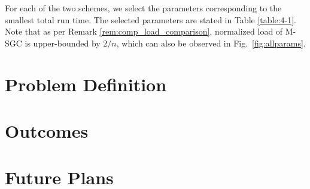 	For each of the two schemes, we select the parameters corresponding to the smallest total run time. The selected parameters are stated in Table \ref{table:4-1}. Note that as per Remark \ref{rem:comp_load_comparison}, normalized load of M-SGC is upper-bounded by $2/n$, which can also be observed in Fig.~\ref{fig:allparams}.




\section{Problem Definition}

\section{Outcomes}

\section{Future Plans}
